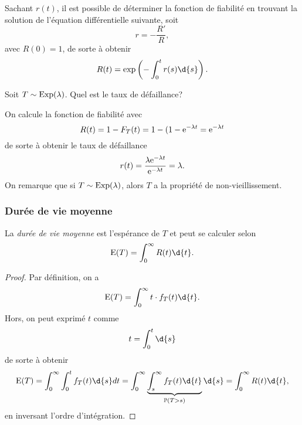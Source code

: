 \documentclass[11pt]{article}
\renewcommand\P{%
	\ensuremath{%
		\mathbb{P}%
	}%
}%
\newcommand\e{%
	\ensuremath{%
		\mathrm{e}%
	}%
}%
\newcommand\Exp{%
	\ensuremath{%
		\mathrm{Exp}%
	}%
}%
\newcommand\Esp{%
	\ensuremath{%
		\mathrm{E}%
	}%
}%
\begin{document}
Sachant $r(t)$, il est possible de déterminer la fonction de fiabilité en
trouvant la solution de l'équation différentielle suivante, soit
\begin{equation*}
	r=-\frac{R\prime}{R},
\end{equation*}
avec $R(0)=1$, de sorte à obtenir
\begin{equation*}
	R(t)=\exp\left(-\int_0^tr(s)\d{s}\right).
\end{equation*}

\begin{exemple}
	Soit $T\sim\Exp(\lambda)$. Quel est le taux de défaillance?

	On calcule la fonction de fiabilité avec
	\begin{equation*}
		R(t)
		=1-F_T(t)
		=1-(1-\e^{-\lambda t}
		=\e^{-\lambda t}
	\end{equation*}
	de sorte à obtenir le taux de défaillance
	\begin{equation*}
		r(t)
		=\frac{\lambda\e^{-\lambda t}}{\e^{-\lambda t}}
		=\lambda.
	\end{equation*}
	On remarque que si $T\sim\Exp(\lambda)$, alors $T$ a la propriété de
	non-vieillissement.
\end{exemple}

\subsubsection{Durée de vie moyenne}
La \textit{durée de vie moyenne} est l'espérance de $T$ et peut se calculer
selon
\begin{equation*}
	\Esp(T)=\int_0^\infty R(t)\d{t}.
\end{equation*}

\begin{proof}
	Par définition, on a
	\begin{equation*}
		\Esp(T)=\int_0^\infty t\cdot f_T(t)\d{t}.
	\end{equation*}
	Hors, on peut exprimé $t$ comme
	\begin{equation*}
		t=\int_0^t\d{s}
	\end{equation*}
	de sorte à obtenir
	\begin{equation*}
		\Esp(T)
		=\int_0^\infty\int_0^t f_T(t)\d{s}d{t}
		=\int_0^\infty\underbrace{\int_s^\infty f_T(t)\d{t}}_{\P(T>s)}\d{s}
		=\int_0^\infty R(t)\d{t},
	\end{equation*}
	en inversant l'ordre d'intégration.
\end{proof}
\end{document}
